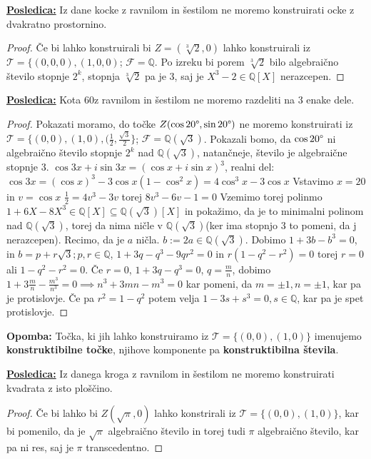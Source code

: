 \documentclass[a4paper]{article}
\newcounter{environment:definition_counter}
\newcounter{environment:theorem_counter}
\newcounter{environment:statement_counter}
\newenvironment{remark}
{\textbf{Opomba:}}
{}
\newenvironment{corollary}
{\underline{\textbf{Posledica:}}}
{}
\begin{document}
\begin{corollary}
Iz dane kocke z ravnilom in šestilom ne moremo konstruirati ocke z dvakratno prostornino.
\end{corollary}

\begin{proof}
Če bi lahko konstruirali bi $Z=(\sqrt[3]{2},0)$ lahko konstruirali iz $\mathcal{T} = \{ (0,0,0), (1,0,0)$; $\mathcal{F} = \mathbb{Q}$. Po izreku bi porem $\sqrt[3]{2}$ bilo algebraično število stopnje $2^k$, stopnja $\sqrt[3]{2}$ pa je $3$, saj je $X^3 - 2 \in \mathbb{Q}[X]$ nerazcepen.
\end{proof}

\begin{corollary}
Kota $60$\textdegree z ravnilom in šestilom ne moremo razdeliti na $3$ enake dele.
\end{corollary}

\begin{proof}
Pokazati moramo, do točke $Z(\cos 20\text{\textdegree}, \sin 20\text{\textdegree})$ ne moremo konstruirati iz $\mathcal{T} = \{(0,0), (1,0), (\frac{1}{2}, \frac{\sqrt{3}}{2} \}$; $\mathcal{F} = \mathbb{Q}(\sqrt{3})$. Pokazali bomo, da $\cos 20\text{\textdegree}$ ni algebraično število stopnje $2^k$ nad $\mathbb{Q}(\sqrt{3})$, natančneje, število je algebraične stopnje $3$.
$\cos 3x + i\sin 3x = (\cos x + i\sin x)^3$, realni del: $\cos 3x = (\cos x)^3  - 3\cos x(1-\cos^2 x) = 4\cos^3 x - 3\cos x$ Vstavimo $x = 20$\textdegree in $v = \cos x$
$\frac{1}{2} = 4v^3 - 3v$ torej $8v^3 - 6v - 1 = 0$ Vzemimo torej polinmo $1 + 6X - 8X^3 \in \mathbb{Q}[X] \subseteq \mathbb{Q}(\sqrt{3})[X]$ in pokažimo, da je to minimalni polinom nad $\mathbb{Q}(\sqrt{3})$, torej da nima ničle v $\mathbb{Q}(\sqrt{3})$(ker ima stopnjo $3$ to pomeni, da j nerazcepen). Recimo, da je $a$ ničla. $b := 2a \in \mathbb{Q}(\sqrt{3})$. Dobimo $1+3b -b^3 = 0$, in $b = p + r\sqrt{3}; p,r \in \mathbb{Q}$, $1 + 3q - q^3 - 9qr^2 = 0$ in $r(1-q^2 - r^2) = 0$ torej $r = 0 $ ali $1- q^2 - r^2 = 0$. Če $r=0$, $1+3q - q^3 = 0$, $q = \frac{m}{n}$, dobimo $1 + 3\frac{m}{n} - \frac{m^3}{n^3} = 0 \implies n^3 + 3mn - m^3 = 0$ kar pomeni, da $m = \pm 1, n = \pm 1$, kar pa je protislovje. Če pa $r^2 = 1-q^2$ potem velja $1-3s +s^3 = 0, s \in \mathbb{Q}$, kar pa je spet protislovje. 
\end{proof}


\begin{remark}
Točka, ki jih lahko konstruiramo iz $\mathcal{T} = \{(0,0), (1,0) \}$ imenujemo \textbf{konstruktibilne točke}, njihove komponente pa \textbf{konstruktibilna števila}.
\end{remark}

\begin{corollary}
Iz danega kroga z ravnilom in šestilom ne moremo konstruirati kvadrata z isto ploščino.
\end{corollary}

\begin{proof}
Če bi lahko bi $Z(\sqrt{\pi}, 0)$ lahko konstrirali iz $\mathcal{T} = \{(0,0), (1,0) \}$, kar bi pomenilo, da je $\sqrt{\pi}$ algebraično število in torej tudi $\pi$ algebraično število, kar pa ni res, saj je $\pi$ transcedentno.
\end{proof}
\end{document}
